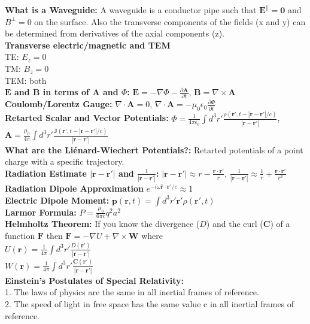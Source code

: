 \documentclass[12pt]{extarticle}
\newcommand{\E}{\mathbf{E}}
\newcommand{\B}{\mathbf{B}}
\newcommand{\A}{\mathbf{A}}
\newcommand{\J}{\mathbf{J}}
\renewcommand{\r}{\mathbf{r}}
\newcommand{\wavr}{\left|\r-\r'\right|}
\begin{document}
\textbf{What is a Waveguide:} A waveguide is a conductor pipe such that $\E^\parallel = \mathbf{0}$ and $B^\perp = 0$ on the surface. Also the transverse components of the fields (x and y) can be determined from derivatives of the axial components (z). \\
\textbf{Transverse electric/magnetic and TEM} \\
TE: $E_z = 0$ \\
TM: $B_z = 0$ \\
TEM: both \\
\textbf{$\E$ and $\B$ in terms of $\A$ and $\Phi$:} $\E = -\nabla\Phi - \frac{\partial\A}{\partial t}$, $\B = \nabla\times\A$ \\
\textbf{Coulomb/Lorentz Gauge:} $\nabla\cdot\A = 0$, $\nabla\cdot\A = -\mu_0\epsilon_0\frac{\partial\Phi}{\partial t}$ \\
\textbf{Retarted Scalar and Vector Potentials:} $\Phi = \frac{1}{4\pi\epsilon_0} \int d^3r' \frac{\rho(\r',t-\wavr/c)}{\wavr}$, $\A = \frac{\mu_0}{4\pi} \int d^3r' \frac{\J(\r',t-\wavr/c)}{\wavr}$ \\
\textbf{What are the Li\'enard-Wiechert Potentials?:} Retarted potentials of a point charge with a specific trajectory. \\
\textbf{Radiation Estimate $\wavr$ and $\frac{1}{\wavr}$:} $\wavr \approx r-\frac{\r\cdot\r'}{r}$, $\frac{1}{\wavr} \approx \frac{1}{r} + \frac{\r\cdot\r'}{r^3}$ \\
\textbf{Radiation Dipole Approximation} $e^{-i\omega\hat{\r}\cdot\r'/c} \approx 1$ \\
\textbf{Electric Dipole Moment:} $\mathbf{p}(\r,t) = \int d^3r'\r'\rho(\r',t)$ \\
\textbf{Larmor Formula:} $P = \frac{\mu_0}{6\pi c}q^2a^2$ \\
\textbf{Helmholtz Theorem:} If you know the divergence ($D$) and the curl ($\mathbf{C}$) of a function $\mathbf{F}$ then $\mathbf{F} = -\nabla U + \nabla\times\mathbf{W}$ where \\
$U(\r) = \frac{1}{4\pi} \int d^3r' \frac{D(\r')}{\wavr}$ \\
$W(\r) = \frac{1}{4\pi} \int d^3r' \frac{\mathbf{C}(\r')}{\wavr}$ \\
\textbf{Einstein's Postulates of Special Relativity:} \\
1. The laws of physics are the same in all inertial frames of reference. \\
2. The speed of light in free space has the same value c in all inertial frames of reference. \\
\end{document}
